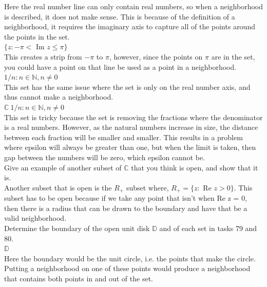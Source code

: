 \documentclass[12pt]{article}
\begin{document}
Here the real number line can only contain real numbers, so when a neighborhood is described, it does not make sense.
This is because of the definition of a neighborhood, it requires the imaginary axis to capture all of the points around the points in the set.\\


 $\{ z : -\pi < $ Im $z \leq \pi \}$ \\

This creates a strip from $-\pi$ to $\pi$, however, since the points on $\pi$ are in the set, you could have a point on that line be used as a point in a neighborhood.\\


 ${1/n: n \in \mathbb{N}, n \neq 0}$ \\

This set has the same issue where the set is only on the real number axis, and thus cannot make a neighborhood.\\

 $\mathbb{C} \ {1/n : n \in \mathbb{N}, n \neq 0}$ \\
This set is tricky because the set is removing the fractions where the denominator is a real numbers.
However, as the natural numbers increase in size, the distance between each fraction will be smaller and smaller.
This results in a problem where epsilon will always be greater than one, but when the limit is taken, then gap between the numbers will be zero, which epsilon cannot be.\\


 Give an example of another subset of $\mathbb{C}$ that you think is open, and show that it is.\\

Another subset that is open is the $R_+$ subset where, $R_+ = \{z :$ Re $z > 0\}$. 
This subset has to be open because if we take any point that isn't when Re z = 0, then there is a radius that can be drawn to the boundary and have that be a valid neighborhood.\\


 Determine the boundary of the open unit disk $\mathbb{D}$ and of each set in tasks 79 and 80.\\

 $\mathbb{D}$\\

Here the boundary would be the unit circle, i.e. the points that make the circle.
Putting a neighborhood on one of these points would produce a neighborhood that contains both points in and out of the set.\\
\end{document}
